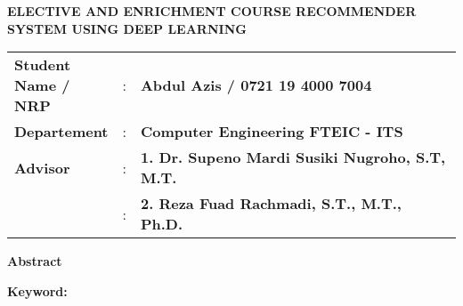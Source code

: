 {
\begin{center}
    \uppercase{\textbf{\large Elective and Enrichment Course Recommender System using Deep Learning}}
\end{center}

\vspace*{6 mm}
\begin{adjustwidth}{}{}
    \begin{tabular}{lcp{1\linewidth}}
        \noindent\textbf{Student Name / NRP} & : & \textbf{Abdul Azis / 0721 19 4000 7004}                \\
        \noindent\textbf{Departement}        & : & \textbf{Computer Engineering FTEIC - ITS}              \\
        \noindent\textbf{Advisor}            & : & \textbf{1. Dr. Supeno Mardi Susiki Nugroho, S.T, M.T.} \\
                                             & : & \textbf{2. Reza Fuad Rachmadi, S.T., M.T., Ph.D.}      \\
    \end{tabular}
\end{adjustwidth}

\vspace{6 mm}
\noindent
\textbf{Abstract}
\vspace{3 mm}


\vspace{6 mm}
\noindent
\textbf{Keyword: }
}



